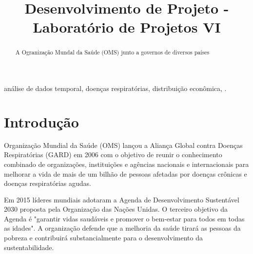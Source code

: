 \documentclass[journal]{IEEEtran}
\begin{document}
\title{Desenvolvimento de Projeto - Laboratório de Projetos VI}

\author{
\and
{}
\and
{}
\and
{}
}


%

\maketitle

\begin{abstract}

A Ogranização Mundal da Saúde (OMS) junto a governos de diversos países
\end{abstract}

\begin{IEEEkeywords}
análise de dados temporal, doenças respiratórias, distribuição econômica, .
\end{IEEEkeywords}

\IEEEpeerreviewmaketitle

\section{Introdução}

 {Organização} Mundial da Saúde (OMS) lançou a Aliança Global contra Doenças Respiratórias (GARD) em 2006 com o objetivo de reunir o conhecimento combinado de organizações, instituições e agências nacionais e internacionais para melhorar a vida de mais de um bilhão de pessoas afetadas por doenças crônicas e doenças respiratórias agudas\cite{firs}.

Em 2015 líderes mundiais adotaram a Agenda de Desenvolvimento Sustentável 2030 proposta pela Organização das Nações Unidas. O terceiro objetivo da Agenda é "garantir vidas saudáveis e promover o bem-estar para todos em todas as idades". A organização defende que a melhoria da saúde tirará as pessoas da pobreza e contribuirá substancialmente para o desenvolvimento da sustentabilidade.
\end{document}
